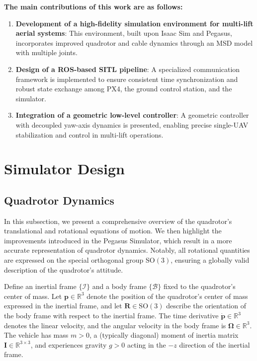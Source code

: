 \documentclass[12pt,twoside,letterpaper]{article}
\begin{document}
\textbf{The main contributions of this work are as follows:} \begin{enumerate} 
\item \textbf{Development of a high-fidelity simulation environment for multi-lift aerial systems}: This environment, built upon Isaac Sim and Pegasus, incorporates improved quadrotor and cable dynamics through an MSD model with multiple joints. 
\item \textbf{Design of a ROS-based SITL pipeline}: A specialized communication framework is implemented to ensure consistent time synchronization and robust state exchange among PX4, the ground control station, and the simulator. 
\item \textbf{Integration of a geometric low-level controller}: A geometric controller with decoupled yaw-axis dynamics is presented, enabling precise single-UAV stabilization and control in multi-lift operations. 
\end{enumerate}


\newpage





\section{Simulator Design}
\subsection{Quadrotor Dynamics}
 In this subsection, we present a comprehensive overview of the quadrotor’s translational and rotational equations of motion. We then highlight the improvements introduced in the Pegasus Simulator, which result in a more accurate representation of quadrotor dynamics. Notably, all rotational quantities are expressed on the special orthogonal group 
$\mathrm{SO}(3)$, ensuring a globally valid description of the quadrotor’s attitude.

Define an inertial frame $\{\mathcal{I}\}$ and a body frame $\{\mathcal{B}\}$ fixed to the quadrotor’s center of mass. Let 
$\mathbf{p} \in \mathbb{R}^3$
denote the position of the quadrotor’s center of mass expressed in the inertial frame, and let
$\mathbf{R} \in \mathrm{SO}(3)$
describe the orientation of the body frame with respect to the inertial frame. The time derivative $\dot{\mathbf{p}} \in \mathbb{R}^3$ denotes the linear velocity, and the angular velocity in the body frame is 
$\boldsymbol{\Omega} \in \mathbb{R}^3.$
The vehicle has mass $m>0$, a (typically diagonal) moment of inertia matrix $\mathbf{I}\in \mathbb{R}^{3\times 3}$, and experiences gravity $g>0$ acting in the $-z$ direction of the inertial frame.
\end{document}
